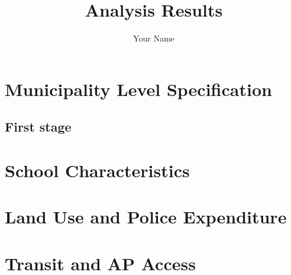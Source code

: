 \documentclass{article}
\begin{document}
\title{Analysis Results}
\author{Your Name}
\date{}

\maketitle

\section{Municipality Level Specification}
\subsection{First stage}







\section{School Characteristics}












\begin{landscape}


\end{landscape}
\section{Land Use and Police Expenditure}




\section{Transit and AP Access}






\end{document}
